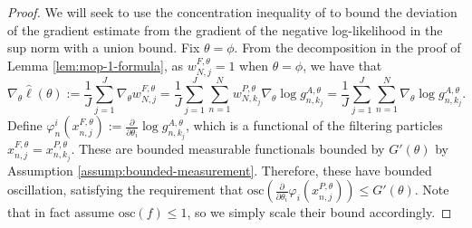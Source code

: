 \begin{proof}


We will seek to use the concentration inequality of \cite{delMoral11} to bound the deviation of the gradient estimate from the gradient of the negative log-likelihood in the sup norm with a union bound. Fix $\theta = \phi$.
From the decomposition in the proof of Lemma \ref{lem:mop-1-formula}, as $w_{N, j}^{F, \theta}=1$ when $\theta=\phi$, we have that
$$
\nabla_\theta \hat{\ell}(\theta):=\frac{1}{J} \sum_{j=1}^J \nabla_\theta w_{N, j}^{F, \theta}=\frac{1}{J} \sum_{j=1}^J\sum_{n=1}^N  w_{N, k_j}^{P, \theta} \nabla_\theta \log g_{n,k_j}^{A,\theta} = \frac{1}{J} \sum_{j=1}^J\sum_{n=1}^N \nabla_\theta \log g_{n,k_j}^{A,\theta}.
$$
Define $\varphi_n^i(x_{n,j}^{F,\theta}) := \frac{\partial}{\partial\theta_i} \log g_{n,k_j}^{A,\theta}$, which is a functional of the filtering particles $x_{n,j}^{F,\theta} = x_{n,k_j}^{P,\theta}$. These are bounded measurable functionals bounded by $G'(\theta)$ by Assumption \ref{assump:bounded-measurement}. Therefore, these have bounded oscillation, satisfying the requirement that $\text{osc} \left(\frac{\partial}{\partial\theta_i} \varphi_i(x_{n,j}^{P,\theta}) \right) \leq G'(\theta)$. Note that \cite{delMoral11} in fact assume $\text{osc}(f) \leq 1$, so we simply scale their bound accordingly.


\end{proof}
